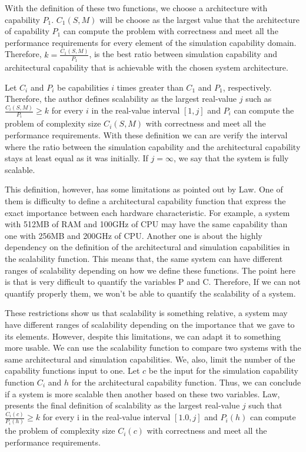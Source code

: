 With the definition of these two functions, we choose a architecture with capability $P_{1}$. $C_{1}(S,M)$ will be choose as the largest value that the architecture of capability $P_{1}$ can compute the problem with correctness and meet all the performance requirements for every element of the simulation capability domain. Therefore, $k = \frac{C_{1}(S,M)}{P_{1}}$, is the best ratio between simulation capability and architectural capability that is achievable with the chosen system architecture.

Let $C_{i}$ and $P_{i}$ be capabilities $i$ times greater than $C_{1}$ and $P_{1}$, respectively. Therefore, the author defines scalability as the largest real-value $j$ such as $\frac{C_{i}(S,M)}{P_{i}} \geq k$ for every $i$ in the real-value interval $[1,j]$ and $P_{i}$ can compute the problem of complexity size $C_{i}(S,M)$ with correctness and meet all the performance requirements. With these definition we can are verify the interval where the ratio between the simulation capability and the architectural capability stays at least equal as it was initially. If $j = \infty$, we say that the system is fully scalable.

This definition, however, has some limitations as pointed out by Law. One of them is  difficulty to define a architectural capability function that express the exact importance between each hardware characteristic. For example, a system with 512MB of RAM and 100GHz of CPU may have the same capability than one with 256MB and 200GHz of CPU. Another one is about the highly dependency on the definition of the architectural and simulation capabilities in the scalability function. This means that, the same system can have different ranges of scalability depending on how we define these functions. The point here is that is very difficult to quantify the variables P and C. Therefore, If we can not quantify properly them, we won't be able to quantify the scalability of a system. 

These restrictions show us that scalability is something relative, a system may have different ranges of scalability depending on the importance that we gave to its elements. However, despite this limitations, we can adapt it to something more usable. We can use the scalability function to compare two systems with the same architectural and simulation capabilities. We, also, limit the number of the capability functions input to one. Let $c$ be the input for the simulation capability function $C_{i}$ and $h$ for the architectural capability function. Thus, we can conclude if a system is more scalable then another based on these two variables. Law, presents the final definition of scalability as the largest real-value $j$ such that $\frac{C_{i}(c)}{P_{i}(h)} \geq k$ for every i in the real-value interval $[1.0, j]$ and $P_{i}(h)$ can compute the problem of complexity size $C_{i}(c)$ with correctness and meet all the performance requirements.

